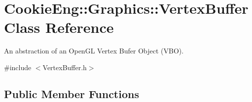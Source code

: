 \hypertarget{class_cookie_eng_1_1_graphics_1_1_vertex_buffer}{}\section{Cookie\+Eng\+:\+:Graphics\+:\+:Vertex\+Buffer Class Reference}
\label{class_cookie_eng_1_1_graphics_1_1_vertex_buffer}


An abstraction of an Open\+GL Vertex Bufer Object (V\+BO).  




{\ttfamily \#include $<$Vertex\+Buffer.\+h$>$}

\subsection*{Public Member Functions}
